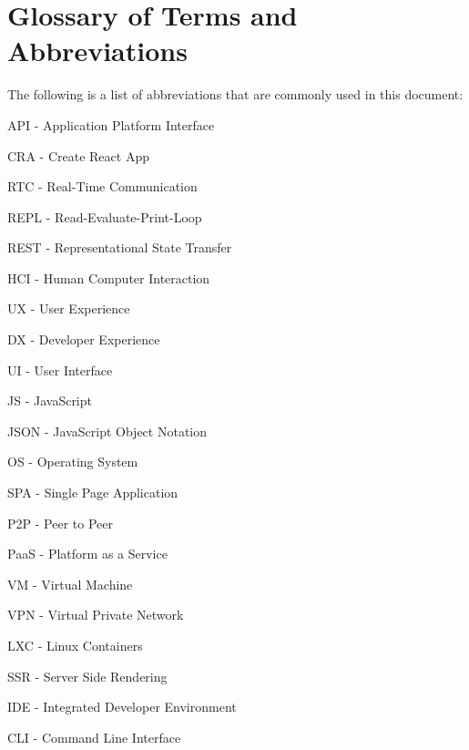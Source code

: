 \section{Glossary of Terms and Abbreviations}
The following is a list of abbreviations that are commonly used in this document:

API - Application Platform Interface

CRA - Create React App

RTC - Real-Time Communication

REPL - Read-Evaluate-Print-Loop

REST - Representational State Transfer

HCI - Human Computer Interaction

UX - User Experience

DX - Developer Experience

UI - User Interface

JS - JavaScript

JSON - JavaScript Object Notation

OS - Operating System

SPA - Single Page Application

P2P - Peer to Peer

PaaS - Platform as a Service

VM - Virtual Machine

VPN - Virtual Private Network

LXC - Linux Containers

SSR - Server Side Rendering

IDE - Integrated Developer Environment

CLI - Command Line Interface 
\pagebreak

